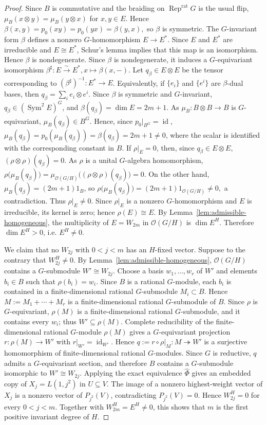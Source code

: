 \documentclass[12pt,leqno]{amsart}
\numberwithin{equation}{section} \newtheorem{thm}{Theorem}[section] \newtheorem{lem}[thm]{Lemma} \newtheorem{ex}[thm]{Example} \newtheorem{prop}[thm]{Proposition} \newtheorem{cor}[thm]{Corollary} \newtheorem{defi}[thm]{Definition} \newtheorem{rmk}[thm]{Remark} \newtheorem{notation}[thm]{Notation}
\newcommand{\id}{\operatorname{id}}
\newcommand{\Rep}{\operatorname{Rep}}
\newcommand{\Sym}{\operatorname{Sym}}
\newcommand{\OO}{\mathcal O}
\begin{document}
\begin{proof}
Since $B$ is commutative and the braiding on $\Rep^{\mathrm{rat}}G$ is the usual flip, $\mu_B(x\otimes y)=\mu_B(y\otimes x)$ for $x,y\in E$. Hence $\beta(x,y)=p_0(xy)=p_0(yx)=\beta(y,x),$ so $\beta$ is symmetric. The $G$-invariant form $\beta$ defines a nonzero $G$-homomorphism $E\to E^*$. Since $E$ and $E^*$ are irreducible and $E\cong E^*$, Schur's lemma implies that this map is an isomorphism. Hence $\beta$ is nondegenerate. Since $\beta$ is nondegenerate, it induces a $G$-equivariant isomorphism \(\beta^\sharp:E\overset{\sim}{\longrightarrow}E^*, x\longmapsto\beta(x,-)\). Let $q_\beta\in E\otimes E$ be the tensor corresponding to $(\beta^\sharp)^{-1}:E^*\to E$. Equivalently, if $\{e_i\}$ and $\{e^i\}$ are $\beta$-dual bases, then $q_\beta=\sum_i e_i\otimes e^i.$ Since $\beta$ is symmetric and $G$-invariant, $q_\beta\in(\Sym^2E)^G$, and $\beta(q_\beta)=\dim E=2m+1.$ As $\mu_B:B\otimes B\to B$ is $G$-equivariant, $\mu_B(q_\beta)\in B^G$. Hence, since $p_0|_{B^G}=\id$, \(\mu_B(q_\beta)=p_0(\mu_B(q_\beta))=\beta(q_\beta)=2m+1\ne0\), where the scalar is identified with the corresponding constant in $B$. If $\rho|_E=0$, then, since $q_\beta\in E\otimes E$, $(\rho\otimes\rho)(q_\beta)=0.$ As $\rho$ is a unital $G$-algebra homomorphism, $\rho\bigl(\mu_B(q_\beta)\bigr) = \mu_{\OO(G/H)} \bigl((\rho\otimes\rho)(q_\beta)\bigr) =0.$ On the other hand, $\mu_B(q_\beta)=(2m+1)1_B$, so $\rho\bigl(\mu_B(q_\beta)\bigr) =(2m+1)1_{\OO(G/H)}\ne0,$ a contradiction. Thus $\rho|_E\ne0$. Since $\rho|_E$ is a nonzero $G$-homomorphism and $E$ is irreducible, its kernel is zero; hence $\rho(E)\cong E$. By Lemma~\ref{lem:admissible-homogeneous}, the multiplicity of $E=W_{2m}$ in $\OO(G/H)$ is $\dim E^H$. Therefore $\dim E^H>0$, i.e. $E^H\ne0$.

We claim that no $W_{2j}$ with $0<j<m$ has an $H$-fixed vector. Suppose to the contrary that $W_{2j}^H\ne0$. By Lemma~\ref{lem:admissible-homogeneous}, $\OO(G/H)$ contains a $G$-submodule $W'\cong W_{2j}$. Choose a basis $w_1,\ldots,w_r$ of $W'$ and elements $b_i\in B$ such that $\rho(b_i)=w_i$. Since $B$ is a rational $G$-module, each $b_i$ is contained in a finite-dimensional rational $G$-submodule $M_i\subset B$. Hence $M:=M_1+\cdots+M_r$ is a finite-dimensional rational $G$-submodule of $B$. Since $\rho$ is $G$-equivariant, $\rho(M)$ is a finite-dimensional rational $G$-submodule, and it contains every $w_i$; thus $W'\subseteq\rho(M)$. Complete reducibility of the finite-dimensional rational $G$-module $\rho(M)$ gives a $G$-equivariant projection $r:\rho(M)\to W'$ with $r|_{W'}=\id_{W'}$. Hence $q:=r\circ\rho|_M:M\twoheadrightarrow W'$ is a surjective homomorphism of finite-dimensional rational $G$-modules. Since $G$ is reductive, $q$ admits a $G$-equivariant section, and therefore $B$ contains a $G$-submodule isomorphic to $W'\cong W_{2j}$. Applying the exact equivalence $\widehat\Phi$ gives an embedded copy of $X_j=L(1,j^2)$ in $U\subseteq V$. The image of a nonzero highest-weight vector of $X_j$ is a nonzero vector of $P_{j^2}(V)$, contradicting $P_{j^2}(V)=0$. Hence $W_{2j}^H=0$ for every $0<j<m$. Together with $W_{2m}^H=E^H\ne0$, this shows that $m$ is the first positive invariant degree of $H$.


\end{proof}
\end{document}
